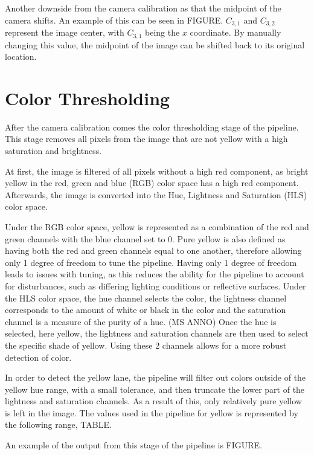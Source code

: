 \documentclass[arbeit=studie,oneside,BCOR=12mm]{ArbeitRST}
\begin{document}
Another downside from the camera calibration as that the midpoint of the camera
shifts. An example of this can be seen in FIGURE. $C_{3,1}$ and $C_{3,2}$ 
represent the image center, with $C_{3,1}$ being the $x$ coordinate. By manually
changing this value, the midpoint of the image can be shifted back to its 
original location.

\section{Color Thresholding}
After the camera calibration comes the color thresholding stage of the pipeline.
This stage removes all pixels from the image that are not yellow with a high
saturation and brightness. 

At first, the image is filtered of all pixels without a high red component, as 
bright yellow in the red, green and blue (RGB) color space has a high red 
component. 
Afterwards, the image is converted into the Hue, Lightness and Saturation (HLS)
color space. 

Under the RGB color space, yellow is represented as a combination of the red 
and green channels with the blue channel set to 0. Pure yellow is also defined 
as having both the red and green channels equal to one another, therefore 
allowing only 1 degree of freedom to tune the pipeline.  Having only 1 degree 
of freedom leads to issues with tuning, as this reduces the ability for the 
pipeline to account for disturbances, such as differing lighting conditions or 
reflective surfaces.
Under the HLS color space, the hue channel selects the color, the lightness 
channel corresponds to the amount of white or black in the color and the 
saturation channel is a measure of the purity of a hue. (MS ANNO) Once the hue 
is selected, here yellow, the lightness and saturation channels are then used 
to select the specific shade of yellow. Using these 2 channels allows for a 
more robust detection of color.

In order to detect the yellow lane, the pipeline will filter out colors outside 
of the yellow hue range, with a small tolerance, and then truncate the lower 
part of the lightness and saturation channels. As a result of this, only 
relatively pure yellow is left in the image.
The values used in the pipeline for yellow is represented by the following 
range,
TABLE.

An example of the output from this stage of the pipeline is FIGURE.
\end{document}
